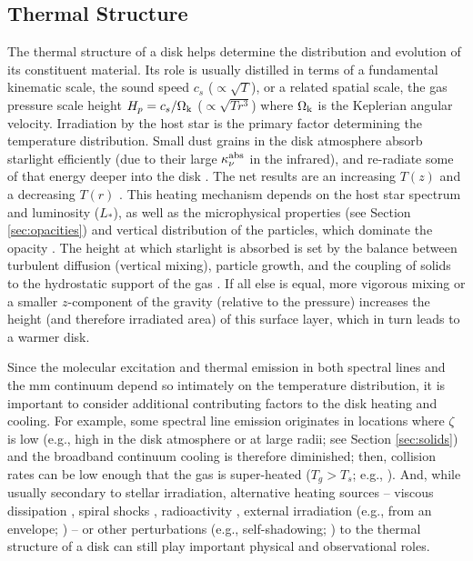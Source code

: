 \documentclass[a4paper]{ar-1col}
\begin{document}


\subsection{Thermal Structure} \label{sec:temp}

The thermal structure of a disk helps determine the distribution and evolution of its constituent material.  Its role is usually distilled in terms of a fundamental kinematic scale, the sound speed $c_s$ ($\propto \sqrt{T}$), or a related spatial scale, the gas pressure scale height $H_p = c_s / \Omega_{\rm k}$ ($\propto \sqrt{T r^3}$) where $\Omega_{\rm k}$ is the Keplerian angular velocity.  Irradiation by the host star is the primary factor determining the temperature distribution.  Small dust grains in the disk atmosphere absorb starlight efficiently (due to their large $\kappa_\nu^{\rm abs}$ in the infrared), and re-radiate some of that energy deeper into the disk \citep[e.g.,][]{chiang97,dalessio98}.  The net results are an increasing $T(z)$ \citep{calvet91} and a decreasing $T(r)$ \citep{kenyon87,adams90}.  This heating mechanism depends on the host star spectrum and luminosity ($L_\ast$), as well as the microphysical properties (see Section \ref{sec:opacities}) and vertical distribution of the particles, which dominate the opacity \citep{dalessio99b,dalessio06,dullemond02,dullemond04b}.  The height at which starlight is absorbed is set by the balance between turbulent diffusion (vertical mixing), particle growth, and the coupling of solids to the hydrostatic support of the gas \citep{dubrulle95,turner10}.  If all else is equal, more vigorous mixing or a smaller $z$-component of the gravity (relative to the pressure) increases the height (and therefore irradiated area) of this surface layer, which in turn leads to a warmer disk.  

Since the molecular excitation and thermal emission in both spectral lines and the mm continuum depend so intimately on the temperature distribution, it is important to consider additional contributing factors to the disk heating and cooling.  For example, some spectral line emission originates in locations where $\zeta$ is low (e.g., high in the disk atmosphere or at large radii; see Section \ref{sec:solids}) and the broadband continuum cooling is therefore diminished; then, collision rates can be low enough that the gas is super-heated ($T_g > T_s$; e.g., \citealt{jonkheid04,kamp04,bruderer13}).  And, while usually secondary to stellar irradiation, alternative heating sources -- viscous dissipation \citep{shakura73,dalessio98}, spiral shocks \citep{rafikov16}, radioactivity \citep[e.g.,][]{cleeves13}, external irradiation (e.g., from an envelope; \citealt{dalessio97}) -- or other perturbations (e.g., self-shadowing; \citealt{dullemond04a}) to the thermal structure of a disk can still play important physical and observational roles.  
\end{document}
